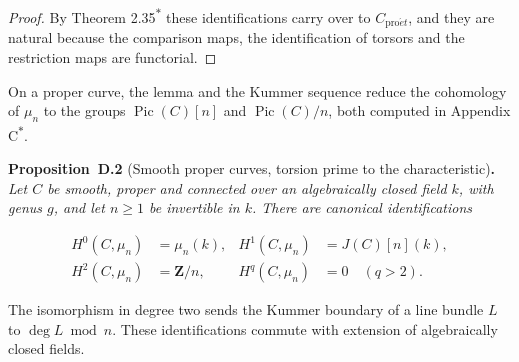 \documentclass[11pt]{article}
\newenvironment{bpstatement}[2]{\par\addvspace{0.6\baselineskip}\noindent\textbf{#1}#2\textbf{.}\enspace\ignorespaces}
  {\par\addvspace{0.4\baselineskip}}
\newenvironment{bpstatementit}[2]{\begin{bpstatement}{#1}{#2}\itshape\ignorespaces}{\end{bpstatement}}
\newcommand{\bpout}[1]{#1\textsuperscript{\hyperlink{bp-outside}{\ensuremath{\ast}}}}
\begin{document}
\begin{proof}[{Proof}]
By Theorem \bpout{2.35} these identifications carry over to \(C_{\mathrm{pro}\acute{e}t}\), and they are natural because the comparison maps, the identification of torsors and the restriction maps are functorial.
\end{proof}

\label{bp7}%
On a proper curve, the lemma and the Kummer sequence reduce the cohomology of \(\mu_n\) to the groups \(\operatorname{Pic}(C)[n]\) and \(\operatorname{Pic}(C)/n\), both computed in Appendix \bpout{C}.

\label{bp8}%
\begin{bpstatementit}{Proposition~D.2}{ (Smooth proper curves, torsion prime to the characteristic)}
Let \(C\) be smooth, proper and connected over an algebraically closed field \(k\), with genus \(g\), and let \(n\geq1\) be invertible in \(k\). There are canonical identifications

\[
\begin{aligned}
H^0(C,\mu_n)&=\mu_n(k),&
H^1(C,\mu_n)&=J(C)[n](k),\\
H^2(C,\mu_n)&=\mathbf Z/n,&
H^q(C,\mu_n)&=0\quad(q>2).
\end{aligned}
\]

The isomorphism in degree two sends the Kummer boundary of a line bundle \(L\) to \(\deg L\bmod n\).  These identifications commute with extension of algebraically closed fields.
\end{bpstatementit}
\end{document}
